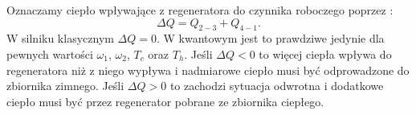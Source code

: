 Oznaczamy ciepło wpływające z regeneratora do czynnika roboczego poprzez \cite{myers}:
\begin{equation}
	\Delta Q = Q_{2-3} + Q_{4-1}.
\end{equation}
W silniku klasycznym \(\Delta Q = 0\). W kwantowym jest to prawdziwe jedynie dla pewnych wartości \(\omega_1\), \(\omega_2\), \(T_c\) oraz \(T_h\). Jeśli \(\Delta Q < 0\) to więcej ciepła wpływa do regeneratora niż z niego wypływa i nadmiarowe ciepło musi być odprowadzone do zbiornika zimnego. Jeśli \(\Delta Q > 0\) to zachodzi sytuacja odwrotna i dodatkowe ciepło musi być przez regenerator pobrane ze zbiornika ciepłego.


